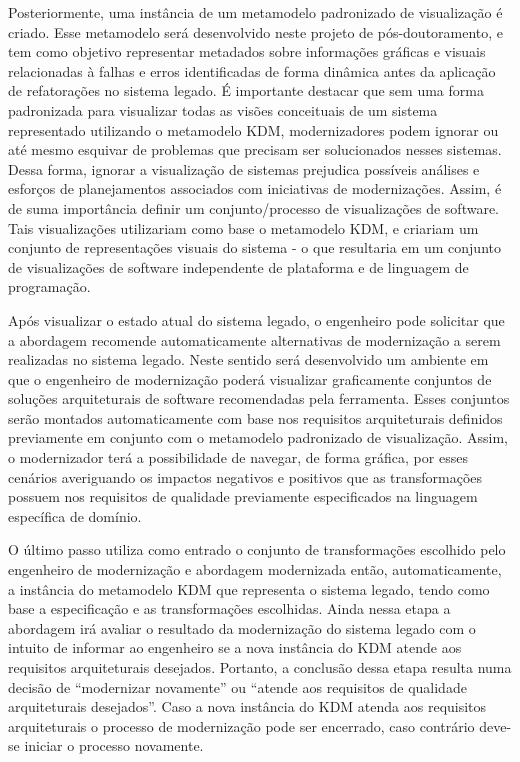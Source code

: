 \documentclass[12pt]{article}
\begin{document}
Posteriormente, uma instância de um metamodelo padronizado de visualização é criado. Esse metamodelo será desenvolvido neste projeto de pós-doutoramento, e tem como objetivo representar metadados sobre informações gráficas e visuais relacionadas à falhas e erros identificadas de forma dinâmica antes da aplicação de refatorações no sistema legado. É importante destacar que sem uma forma padronizada para visualizar todas as visões conceituais de um sistema representado utilizando o metamodelo KDM, modernizadores podem ignorar ou até mesmo esquivar de problemas que precisam ser solucionados nesses sistemas. Dessa forma, ignorar a visualização de sistemas prejudica possíveis análises e esforços de planejamentos associados com iniciativas de modernizações. Assim, é de suma importância definir um conjunto/processo de visualizações de software. Tais visualizações utilizariam como base o metamodelo KDM, e criariam um conjunto de representações visuais do sistema - o que resultaria em um conjunto de visualizações de software independente de plataforma e de linguagem de programação.

Após visualizar o estado atual do sistema legado, o engenheiro pode solicitar que a abordagem recomende automaticamente alternativas de modernização a serem realizadas no sistema legado. Neste sentido será desenvolvido um ambiente em que o engenheiro de modernização poderá visualizar graficamente conjuntos de soluções arquiteturais de software recomendadas pela ferramenta. Esses conjuntos serão montados automaticamente com base nos requisitos arquiteturais definidos previamente em conjunto com o metamodelo padronizado de visualização. Assim, o modernizador terá a possibilidade de navegar, de forma gráfica, por esses cenários averiguando os impactos negativos e positivos que as transformações possuem nos requisitos de qualidade previamente especificados na linguagem específica de domínio.

O último passo utiliza como entrado o conjunto de transformações escolhido pelo engenheiro de modernização e abordagem modernizada então, automaticamente, a instância do metamodelo KDM que representa o sistema legado, tendo como base a especificação e as transformações escolhidas. Ainda nessa etapa a abordagem irá avaliar o resultado da modernização do sistema legado com o intuito de informar ao engenheiro se a nova instância do KDM atende aos requisitos arquiteturais desejados. Portanto, a conclusão dessa etapa resulta numa decisão de ``modernizar novamente'' ou ``atende aos requisitos de qualidade arquiteturais desejados''. Caso a nova instância do KDM atenda aos requisitos arquiteturais o processo de modernização pode ser encerrado, caso contrário deve-se iniciar o processo novamente.
\end{document}
